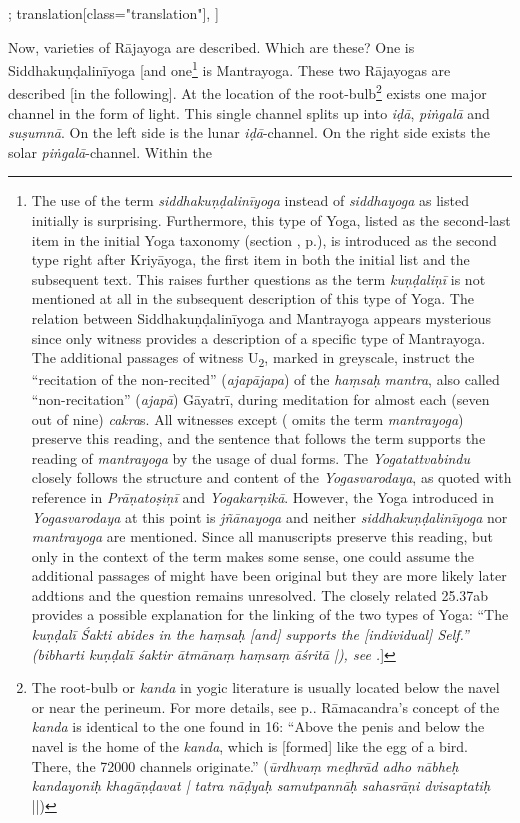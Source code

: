 \begin{alignment}[
    texts=edition[class="edition"];
    translation[class="translation"],
  ]
\begin{translation}
\begin{tlate}[p03_1]
      \noindent Now, varieties of Rājayoga are described. Which are these? One is Siddhakuṇḍalinīyoga [and one\footnote{The use of the term \textit{siddhakuṇḍalinīyoga} instead of \textit{siddhayoga} as listed initially is surprising. Furthermore, this type of Yoga, listed as the second-last item in the initial Yoga taxonomy (section , p.\pageref{intro}), is introduced as the second type right after Kriyāyoga, the first item in both the initial list and the subsequent text. This raises further questions as the term \textit{kuṇḍaliṇī} is not mentioned at all in the subsequent description of this type of Yoga. The relation between Siddhakuṇḍalinīyoga and Mantrayoga appears mysterious since only witness  provides a description of a specific type of Mantrayoga. The additional passages of witness U\textsubscript{2}, marked in greyscale, instruct the ``recitation of the non-recited'' (\textit{ajapājapa}) of the \textit{haṃsaḥ} \textit{mantra}, also called ``non-recitation'' (\textit{ajapā}) Gāyatrī, during meditation for almost each (seven out of nine) \textit{cakra}s. All witnesses except  ( omits the term \textit{mantrayoga}) preserve this reading, and the sentence that follows the term supports the reading of \textit{mantrayoga} by the usage of dual forms. The \textit{Yogatattvabindu} closely follows the structure and content of the \textit{Yogasvarodaya}, as quoted with reference in \textit{Prāṇatoṣiṇī} and \textit{Yogakarṇikā}. However, the Yoga introduced in \textit{Yogasvarodaya} at this point is \textit{jñānayoga} and neither \textit{siddhakuṇḍalinīyoga} nor \textit{mantrayoga} are mentioned. Since all manuscripts preserve this reading, but only in the context of  the term makes some sense, one could assume the additional passages of  might have been original but they are more likely later addtions and the question remains unresolved. The closely related  25.37ab provides a possible explanation for the linking of the two types of Yoga: ``The \textit{{kuṇḍalī} Śakti abides in the \textit{haṃsaḥ} [and] supports the [individual] Self.'' (\textit{bibharti kuṇḍalī śaktir ātmānaṃ haṃsaṃ āśritā} |), see \citeauthor[2011: pp. 218, 228]{saradatilakafull}.}]} is Mantrayoga. These two Rājayogas are described [in the following]. At the location of the root-bulb\footnote{The root-bulb or \textit{kanda} in yogic literature is usually located below the navel or near the perineum. For more details, see p.\pageref{antaralaksya}. Rāmacandra's concept of the \textit{kanda} is identical to the one found in  16: ``Above the penis and below the navel is the home of the \textit{kanda}, which is [formed] like the egg of a bird. There, the 72000 channels originate.'' (\textit{ūrdhvaṃ meḍhrād adho nābheḥ kandayoniḥ khagāṇḍavat | tatra nāḍyaḥ samutpannāḥ sahasrāṇi dvisaptatiḥ} ||)} exists one major channel in the form of light. This single channel splits up into \textit{iḍā}, \textit{piṅgalā} and \textit{suṣumnā}. On the left side is the lunar \textit{iḍā}-channel. On the right side exists the solar \textit{piṅgalā}-channel. Within the 
\end{tlate}
\end{translation}
\end{alignment}
